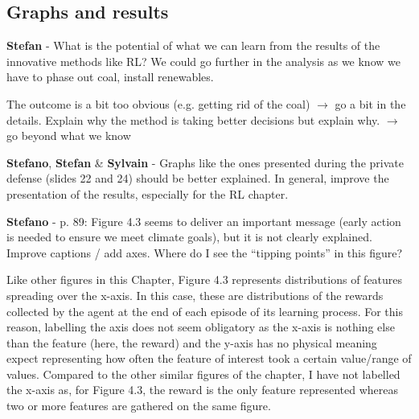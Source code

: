 \documentclass[12pt,a4paper]{article}
\begin{document}
\subsection{Graphs and results}
\begin{mdframed}[style=comment] %
{\color{teal} \textbf{Stefan}} - What is the potential of what we can learn from the results of the innovative methods like RL? We could go further in the analysis as we know we have to phase out coal, install renewables.
\end{mdframed}

\noindent The outcome is a bit too obvious (e.g. getting rid of the coal) $\rightarrow$ go a bit in the details. Explain why the method is taking better decisions but explain why. $\rightarrow$ go beyond what we know

\begin{mdframed}[style=manuscript] %

\end{mdframed}

\begin{mdframed}[style=comment] %
{\color{orange} \textbf{Stefano}}, {\color{teal} \textbf{Stefan}} \& {\color{purple} \textbf{Sylvain}} - Graphs like the ones presented during the private defense (slides 22 and 24) should be better explained. In general, improve the presentation of the results, especially for the RL chapter.
\end{mdframed}

\noindent 

\begin{mdframed}[style=manuscript] %

\end{mdframed}

\begin{mdframed}[style=comment] %
{\color{orange} \textbf{Stefano}} - p. 89: Figure 4.3 seems to deliver an important message (early action is needed to ensure we meet climate goals), but it is not clearly explained. Improve captions / add axes. 	Where do I see the ``tipping points'' in this figure?
\end{mdframed}

\noindent Like other figures in this Chapter, Figure 4.3 represents distributions of features spreading over the x-axis. In this case, these are distributions of the rewards collected by the agent at the end of each episode of its learning process. For this reason, labelling the axis does not seem obligatory as the x-axis is nothing else than the feature (here, the reward) and the y-axis has no physical meaning expect representing how often the feature of interest took a certain value/range of values. Compared to the other similar figures of the chapter, I have not labelled the x-axis as, for Figure 4.3, the reward is the only feature represented whereas two or more features are gathered on the same figure.
\end{document}
